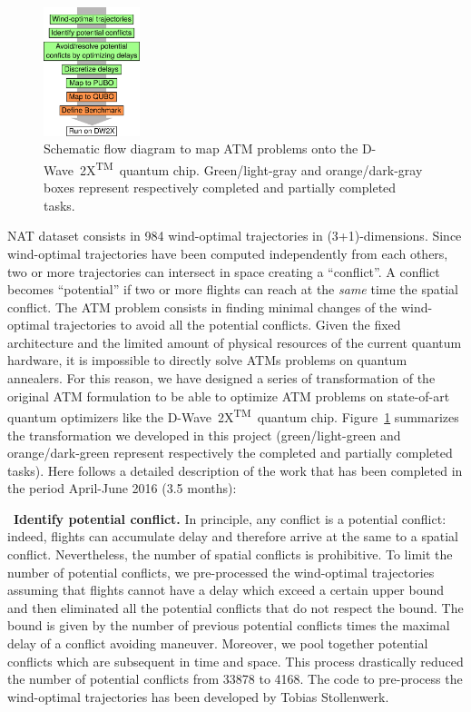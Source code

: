 \documentclass[9pt]{extarticle}
\renewcommand{\figurename}{Figure}
\newcommand{\DW}{\mbox{D-Wave 2X\textsuperscript{TM}}~}
\begin{document}
%
\begin{figure}
\centering
\includegraphics[width=0.25\textwidth]{scheme}
\caption{\label{fig:scheme}Schematic flow diagram to map ATM problems onto the \DW quantum chip. Green/light-gray and orange/dark-gray boxes represent
respectively completed and partially completed tasks.}
\end{figure}
%
NAT dataset consists in 984 wind-optimal trajectories in (3+1)-dimensions. Since wind-optimal
trajectories have been computed independently from each others, two or more trajectories can intersect in space creating a ``conflict''. 
A conflict becomes ``potential'' if two or more flights can reach at the \emph{same} time the spatial conflict. The ATM problem consists
in finding minimal changes of the wind-optimal trajectories to avoid all the potential conflicts. 
Given the fixed architecture and the limited amount of physical resources of the current quantum hardware, it is impossible to directly solve ATMs problems
on quantum annealers. For this reason, we have designed a series of transformation of the original ATM formulation 
to be able to optimize ATM problems on state-of-art quantum optimizers like the \DW quantum chip. \figurename~\ref{fig:scheme} summarizes the transformation 
we developed in this project (green/light-green and orange/dark-green represent respectively the completed and partially completed tasks).
Here follows a detailed description of the work that has been completed in the period April-June 2016 (3.5 months):

\begin{changemargin}{0.5cm}{0cm}
\textbullet~\textbf{Identify potential conflict.} In principle, any conflict is a potential conflict: indeed, flights can accumulate delay
and therefore arrive at the same to a spatial conflict. Nevertheless, the number of spatial conflicts is prohibitive. To limit the number
of potential conflicts, we pre-processed the wind-optimal trajectories assuming that flights cannot have a delay
which exceed a certain upper bound and then eliminated all the potential conflicts that do not respect the bound.
The bound is given by the number of previous potential conflicts times the maximal delay of a conflict avoiding maneuver.  
Moreover, we pool together potential conflicts which are subsequent in time and space.
This process drastically reduced the number of potential conflicts from
33878 to 4168.
The code to pre-process the wind-optimal trajectories has
been developed by Tobias Stollenwerk.
\end{changemargin}
\end{document}
